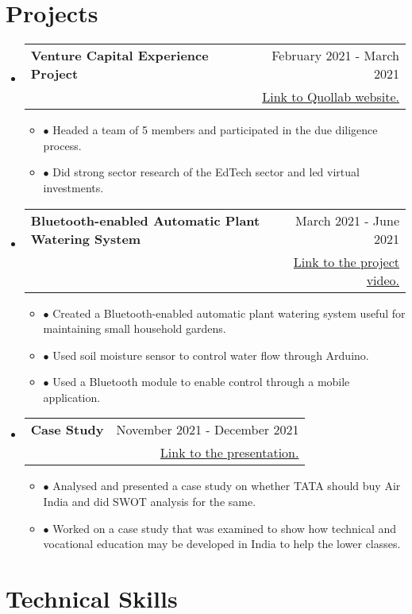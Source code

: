 \documentclass[a4paper,11pt]{article}
\makeatletter
\newcommand{\resumeProject}[4]{
\vspace{1mm}\item[]
    \begin{tabular*}{\textwidth}[t]{l@{\extracolsep{\fill}}r}
        \hspace{-4.4mm} \small\textbf{#1} & {\footnotesize{#3}}\vspace{-0.5mm}\\
        \hspace{-4.3mm} \footnotesize{\text{#2}} & \footnotesize{#4}
    \end{tabular*}
    \vspace{-4.5mm}
}
\newcommand{\resumeSubHeadingListStart}{\begin{itemize}[leftmargin=*,labelsep=0mm,itemsep=-2.5mm]}
\newcommand{\resumeItemListStart}{\begin{justify}\begin{itemize}[leftmargin=3ex, rightmargin=2ex, noitemsep,labelsep=1.2mm,itemsep=0mm]\small}
\newcommand{\resumeSubHeadingListEnd}{\end{itemize}\vspace{-2mm}}
\newcommand{\resumeItemListEnd}{\end{itemize}\end{justify}\vspace{-1.5mm}}
\makeatother
\begin{document}
\section{Projects}
\resumeSubHeadingListStart

\resumeProject
{Venture Capital Experience Project} %
{Quollab} %
{February 2021 - March 2021} %
{\href{https://quollab.com/}{Link to Quollab website.}} %
\resumeItemListStart
\item[$\bullet$] Headed a team of 5 members and participated in the due diligence process.
\item[$\bullet$] Did strong sector research of the EdTech sector and led virtual investments.

\resumeItemListEnd

\resumeProject
{Bluetooth-enabled Automatic Plant Watering System}
{Prof.  Vikrant Racherla,  IIT Kharagpur} %
{March 2021 - June 2021} %
{\href{https://youtu.be/vSBbuox9BX4}{Link to the project video.}} 
\resumeItemListStart
\item[$\bullet$] Created a Bluetooth-enabled automatic plant watering system useful for maintaining small household gardens.
\item[$\bullet$] Used soil moisture sensor to control water flow through Arduino.
\item[$\bullet$] Used a Bluetooth module to enable control through a mobile application.
\resumeItemListEnd

\resumeProject
{Case Study 
}
{ShARE, IIT Kharagpur} %
{November 2021 - December 2021} %
{\href{https://drive.google.com/drive/folders/1T-zYbgaR85XATaBYmwf45kFPz2gli375?usp=share_link}{Link to the presentation.}} 
\resumeItemListStart
\item[$\bullet$] Analysed and presented a case study on whether TATA should buy Air India and did SWOT analysis for the same.
\item[$\bullet$] Worked on a case study that was examined to show how technical and vocational education may be developed in India to help the lower classes.

\resumeItemListEnd

\resumeSubHeadingListEnd

\vspace{-5.5mm}


\section{Technical Skills}
\vspace{0.2mm}
\end{document}
